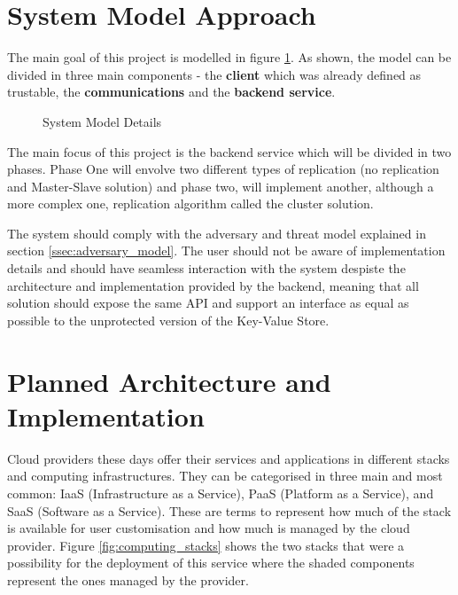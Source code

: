 \section{System Model Approach} %
\label{sec:system_model_approach}

The main goal of this project is modelled in figure \ref{fig:syste_model_detailed}. As shown, the model can be divided in three main components - the \textbf{client} which was already defined as trustable, the \textbf{communications} and the \textbf{backend service}. 

\begin{figure}[htbp]
  \caption{System Model Details}
  \label{fig:syste_model_detailed}
\end{figure}

The main focus of this project is the backend service which will be divided in two phases. Phase One will envolve two different types of replication (no replication and Master-Slave solution) and phase two, will implement another, although a more complex one, replication algorithm called the cluster solution.

The system should comply with the adversary and threat model explained in section \ref{ssec:adversary_model}. The user should not be aware of implementation details and should have seamless interaction with the system despiste the architecture and implementation provided by the backend, meaning that all solution should expose the same \gls{API} and support an interface as equal as possible to the unprotected version of the Key-Value Store.

\section{Planned Architecture and Implementation} %
\label{sec:planned_architecture_and_implementation}

Cloud providers these days offer their services and applications in different stacks and computing infrastructures. They can be categorised in three main and most common: \gls{IaaS} (Infrastructure as a Service), \gls{PaaS} (Platform as a Service), and \gls{SaaS} (Software as a Service). These are terms to represent how much of the stack is available for user customisation and how much is managed by the cloud provider. Figure \ref{fig:computing_stacks} shows the two stacks that were a possibility for the deployment of this service where the shaded components represent the ones managed by the provider.

